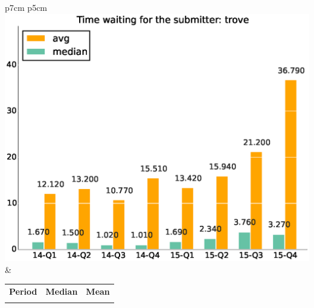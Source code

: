 \documentclass[a4wide,11pt]{article}
\begin{document}
\begin{tabular}{p{7cm} p{5cm}}
    \vspace{0pt} 
    \includegraphics[scale=.35]{figs/waiting4submitter_avgtrove.eps}
    & 
    \vspace{0pt}
    \begin{tabular}{l|r|r|}%
    \bfseries Period & \bfseries Median & \bfseries Mean %
    \csvreader[head to column names]{data/timewaiting4submitter_mediantrove.csv}{}%
    {\\ & \mediantime & \meantime}
    \end{tabular}
\end{tabular}
\end{document}
